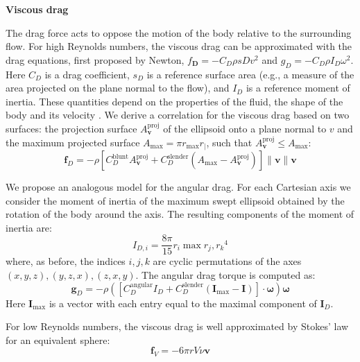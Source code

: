 \documentclass[sn-mathphys-num]{sn-jnl}%
\theoremstyle{thmstyleone}	%
\theoremstyle{thmstyletwo}	%
\theoremstyle{thmstylethree}	%
\begin{document}
\begin{appendices}
\textbf{Viscous drag}

The drag force acts to oppose the motion of the body relative to the surrounding flow. 
For high Reynolds numbers, the viscous drag can be approximated with the drag equations, first proposed by Newton, $ f_\mathbf{D} = - C_D \rho s D v^2 $ and $ g_D = -C_D \rho I_D \omega^2 $. 
Here $ C_D $ is a drag coefficient, $ s_D $ is a reference surface area (e.g., a measure of the area projected on the plane normal to the flow), and $ I_D $ is a reference moment of inertia. 
These quantities depend on the properties of the fluid, the shape of the body and its velocity \cite{duan2015sphere}. 
We derive a correlation for the viscous drag based on two surfaces: the projection surface $ A_\mathbf{v}^\text{proj} $ of the ellipsoid onto a plane normal to $ v $ and the maximum projected surface $ A_\text{max} = \pi r_{\max} r_{\mid} $, 
such that $ A_\mathbf{v}^{\text{proj}} \leq A_{\max} $:
%
\begin{equation}\label{key}
	\mathbf{f}_D = 
		- \rho
		[
			C_D^\text{blunt}  A_{\mathbf{v}}^\text{proj}
			+ C_D^\text{slender} (A_{\max} - A_\mathbf{v}^\text{proj})
		]
		\|
			\mathbf{v}
		\|
		\mathbf{v}
\end{equation}

We propose an analogous model for the angular drag. 
For each Cartesian axis we consider the moment of inertia of the maximum swept ellipsoid obtained by the rotation of the body around the axis. 
The resulting components of the moment of inertia are:
%
\begin{equation}\label{eq:inertial_moment}
	I_{D,i} = 
		\frac{8 \pi}{15}
		r_i
		\max {r_j, r_k}^4
\end{equation}
where, as before, the indices $ i, j, k $ are cyclic permutations of the axes $ (x, y, z), (y, z, x), (z, x, y) $. 
The angular drag torque is computed as:
%
\begin{equation}\label{key}
	\mathbf{g}_D = 
		- \rho
		(
			[ 
				C_D^\text{angular} I_D 
				+ C_D^\text{slender} (\mathbf{I}_{\max} - \mathbf{I})
			] \cdot \mathbf{\omega}
		) \mathbf{\omega}
\end{equation}
Here $ \mathbf{I}_{\max} $ is a vector with each entry equal to the maximal component of $ \mathbf{I}_D $.


For low Reynolds numbers, the viscous drag is well approximated by Stokes' law \cite{stokes1851effect} for an equivalent sphere:
\begin{equation}\label{eq:f_V}
	\mathbf{f}_V = 
		- 6 \pi r V \nu \mathbf{v}
\end{equation}


\end{appendices}
\end{document}
